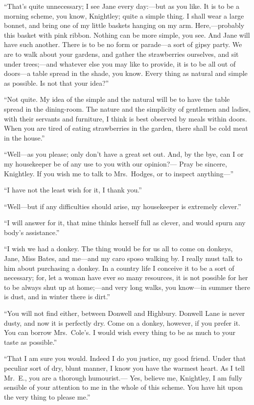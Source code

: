 ``That's quite unnecessary; I see Jane every day:---but as you like.
It is to be a morning scheme, you know, Knightley; quite a simple thing.
I shall wear a large bonnet, and bring one of my little baskets
hanging on my arm.  Here,---probably this basket with pink ribbon.
Nothing can be more simple, you see.  And Jane will have such another.
There is to be no form or parade---a sort of gipsy party.  We are
to walk about your gardens, and gather the strawberries ourselves,
and sit under trees;---and whatever else you may like to provide,
it is to be all out of doors---a table spread in the shade, you know.
Every thing as natural and simple as possible.  Is not that your idea?''

``Not quite.  My idea of the simple and the natural will be to have
the table spread in the dining-room. The nature and the simplicity
of gentlemen and ladies, with their servants and furniture, I think
is best observed by meals within doors.  When you are tired of eating
strawberries in the garden, there shall be cold meat in the house.''

``Well---as you please; only don't have a great set out.  And, by the bye,
can I or my housekeeper be of any use to you with our opinion?---%
Pray be sincere, Knightley.  If you wish me to talk to Mrs.\ Hodges,
or to inspect anything---''

``I have not the least wish for it, I thank you.''

``Well---but if any difficulties should arise, my housekeeper
is extremely clever.''

``I will answer for it, that mine thinks herself full as clever,
and would spurn any body's assistance.''

``I wish we had a donkey.  The thing would be for us all to come
on donkeys, Jane, Miss Bates, and me---and my caro sposo walking by.
I really must talk to him about purchasing a donkey.  In a country
life I conceive it to be a sort of necessary; for, let a woman have
ever so many resources, it is not possible for her to be always shut
up at home;---and very long walks, you know---in summer there is dust,
and in winter there is dirt.''

``You will not find either, between Donwell and Highbury.
Donwell Lane is never dusty, and now it is perfectly dry.  Come on
a donkey, however, if you prefer it.  You can borrow Mrs.\ Cole's.
I would wish every thing to be as much to your taste as possible.''

``That I am sure you would.  Indeed I do you justice, my good friend.
Under that peculiar sort of dry, blunt manner, I know you have the
warmest heart.  As I tell Mr.\ E., you are a thorough humourist.---%
Yes, believe me, Knightley, I am fully sensible of your attention
to me in the whole of this scheme.  You have hit upon the very thing
to please me.''

